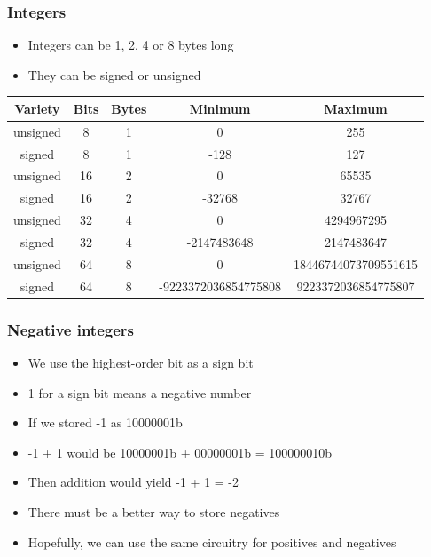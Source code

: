 \documentclass{beamer}
\begin{document}
\begin{frame}
    \frametitle{Integers}
\begin{itemize}
    \item Integers can be 1, 2, 4 or 8 bytes long
    \item They can be signed or unsigned
\end{itemize}

\small
\begin{center}
\begin{tabular}{|c|c|c|c|c|}
\hline
Variety & Bits & Bytes & Minimum & Maximum \\
\hline
unsigned & 8   & 1     & 0       & 255 \\
\hline
signed & 8     & 1     & -128    & 127 \\
\hline
unsigned & 16  & 2     & 0       & 65535 \\
\hline
signed & 16    & 2     & -32768  & 32767 \\
\hline
unsigned & 32  & 4     & 0       & 4294967295 \\
\hline
signed & 32    & 4     & -2147483648    & 2147483647 \\
\hline
unsigned & 64  & 8     & 0       & 18446744073709551615 \\
\hline
signed & 64    & 8     & -9223372036854775808    & 9223372036854775807 \\
\hline
\end{tabular}
\end{center}
\end{frame}

\begin{frame}
    \frametitle{Negative integers}
    \begin{itemize}
        \item We use the highest-order bit as a sign bit
        \item 1 for a sign bit means a negative number
        \item If we stored -1 as 10000001b
        \item -1 + 1 would be 10000001b + 00000001b = 100000010b
        \item Then addition would yield -1 + 1 = -2
        \item There must be a better way to store negatives
        \item Hopefully, we can use the same circuitry for positives and negatives
    \end{itemize}

\end{frame}
\end{document}
